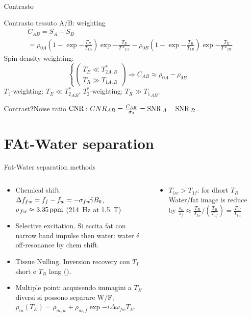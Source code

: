 \begin{frame}{Contrasto}
    \begin{block}{Contrasto tessuto A/B: weighting}
\begin{align*}
&C_{AB}=S_A-S_B\\
&=\rho_{0A}(1-\exp{-\frac{T_R}{T_{1A}}})\exp{-\frac{T_E}{T*_{2A}}}-\rho_{0B}(1-\exp{-\frac{T_R}{T_{1B}}})\exp{-\frac{T_E}{T*_{2B}}}
\end{align*}
Spin density weighting:
\begin{equation*}
\left\{\begin{pmatrix}T_E\ll T_{2A,B}^*\\ T_R\gg T_{1A,B}\end{pmatrix}\right.\Rightarrow C_{AB}\approx\rho_{0A}-\rho_{0B}
\end{equation*}
$T_1$-weighting: $T_E\ll {T_2^*}_{AB}$.
$T_2^*$-weighting: $T_R\gg {T_1}_{AB}$.
\end{block}
Contrast2Noise ratio $\operatorname{CNR}{}$: $CNR_{AB}=\frac{C_{AB}}{\sigma_0}=\operatorname{SNR}{}_A-\operatorname{SNR}{}_B$.
\end{frame}

\section{FAt-Water separation}

\begin{frame}{Fat-Water separation methods}
\begin{columns}
\begin{column}{0.5\textwidth}
\begin{itemize}
    \item Chemical shift. $\Delta f_{fw}=f_f-f_w=-\sigma_{fw}\gammabar B_0$, $\sigma_{fw}\approx3.35\operatorname{ppm}$ (\SI{214}{\hertz} at \SI{1.5}{\tesla})
    \item Selective excitation. Si eccita fat con narrow band impulse then water: water \'e off-resonance by chem shift.
    \item Tissue Nulling. Inversion recovery con $T_I$ short e $T_R$ long ().
    \item Multiple point: acquisendo immagini a $T_E$ diversi si possono separare W/F; $\rho_m(T_E)=\rho_{m,w}+\rho_{m,f}\exp{-i\Delta\omega_{fw}T_E}$.
\end{itemize}
\end{column}
\begin{column}{0.5\textwidth}
\begin{itemize}
    \item $T_{1w}>T_{1f}$: for dhort $T_R$ Water/fat image is reduce by $\frac{s_w}{s_f}\approx\frac{T_R}{T_{1w}}/(\frac{T_R}{T_{1f}})=\frac{T_{1f}}{T_{1w}}$
\end{itemize}
\end{column}
\end{columns}
\end{frame}

